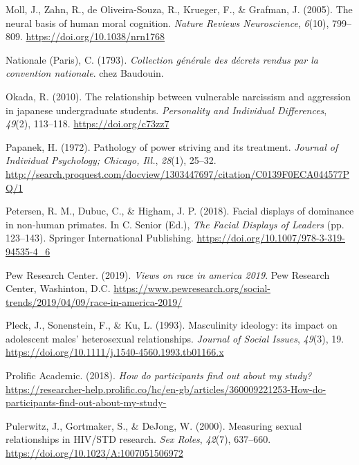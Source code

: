 \documentclass[
  donotrepeattitle,doc, 12pt, a4paper,floatsintext]{apa7}
\newlength{\cslhangindent}
\newlength{\cslentryspacingunit} %
\newenvironment{CSLReferences}[2] %
 {%
  \setlength{\parindent}{0pt}
  \ifodd #1
  \let\oldpar\par
  \def\par{\hangindent=\cslhangindent\oldpar}
  \fi
  \setlength{\parskip}{#2\cslentryspacingunit}
 }%
 {}
\begin{document}
\begin{CSLReferences}{1}{0}
\leavevmode{}%
Moll, J., Zahn, R., de Oliveira-Souza, R., Krueger, F., \& Grafman, J. (2005). The neural basis of human moral cognition. \emph{Nature Reviews Neuroscience}, \emph{6}(10), 799--809. \url{https://doi.org/10.1038/nrn1768}

\leavevmode{}%
Nationale (Paris), C. (1793). \emph{Collection générale des décrets rendus par la convention nationale}. chez Baudouin.

\leavevmode{}%
Okada, R. (2010). The relationship between vulnerable narcissism and aggression in japanese undergraduate students. \emph{Personality and Individual Differences}, \emph{49}(2), 113--118. \url{https://doi.org/c73zz7}

\leavevmode{}%
Papanek, H. (1972). Pathology of power striving and its treatment. \emph{Journal of Individual Psychology; Chicago, Ill.}, \emph{28}(1), 25--32. \url{http://search.proquest.com/docview/1303447697/citation/C0139F0ECA044577PQ/1}

\leavevmode{}%
Petersen, R. M., Dubuc, C., \& Higham, J. P. (2018). Facial displays of dominance in non-human primates. In C. Senior (Ed.), \emph{The Facial Displays of Leaders} (pp. 123--143). Springer International Publishing. \url{https://doi.org/10.1007/978-3-319-94535-4_6}

\leavevmode{}%
Pew Research Center. (2019). \emph{Views on race in america 2019}. Pew Research Center, Washinton, D.C. \url{https://www.pewresearch.org/social-trends/2019/04/09/race-in-america-2019/}

\leavevmode{}%
Pleck, J., Sonenstein, F., \& Ku, L. (1993). Masculinity ideology: its impact on adolescent males' heterosexual relationships. \emph{Journal of Social Issues}, \emph{49}(3), 19. \url{https://doi.org/10.1111/j.1540-4560.1993.tb01166.x}

\leavevmode{}%
Prolific Academic. (2018). \emph{How do participants find out about my study?} \url{https://researcher-help.prolific.co/hc/en-gb/articles/360009221253-How-do-participants-find-out-about-my-study-}

\leavevmode{}%
Pulerwitz, J., Gortmaker, S., \& DeJong, W. (2000). Measuring sexual relationships in HIV/STD research. \emph{Sex Roles}, \emph{42}(7), 637--660. \url{https://doi.org/10.1023/A:1007051506972}


\end{CSLReferences}
\end{document}
